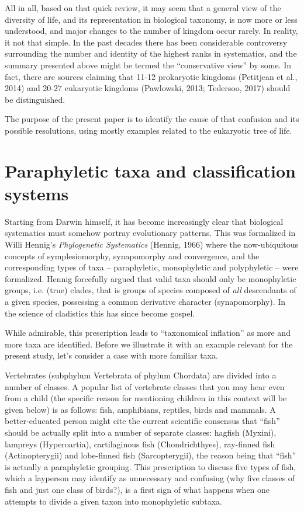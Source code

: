 \begin{artengenv}
All in all, based on that quick review, it may seem that a general view of the diversity of life, and its representation
in biological taxonomy, is now more or less understood, and major changes to the number of kingdom occur rarely. In
reality, it not that simple. In the past decades there has been considerable controversy surrounding the number and
identity of the highest ranks in systematics, and the summary presented above might be termed the “conservative view”
by some. In fact, there are sources claiming that 11-12 prokaryotic kingdoms \label{ref:RNDXxF0Lm1b0k}(Petitjean et
al., 2014) and 20-27 eukaryotic kingdoms \label{ref:RNDB4YmCpjg7j}(Pawlowski, 2013; Tedersoo, 2017) should be
distinguished.

The purpose of the present paper is to identify the cause of that confusion and its possible resolutions, using mostly
examples related to the eukaryotic tree of life.

\section{Paraphyletic taxa and classification systems}

Starting from Darwin himself, it has become increasingly clear that biological systematics must somehow portray
evolutionary patterns. This was formalized in Willi Hennig’s \textit{Phylogenetic Systematics}
\label{ref:RNDWJhbleZaU4}(Hennig, 1966) where the now-ubiquitous concepts of symplesiomorphy, synapomorphy and
convergence, and the corresponding types of taxa – paraphyletic, monophyletic and polyphyletic – were formalized.
Hennig forcefully argued that valid taxa should only be monophyletic groups, i.e. (true) clades, that is groups of
species composed of \textit{all} descendants of a given species, possessing a common derivative character
(synapomorphy). In the science of cladistics this has since become gospel.

While admirable, this prescription leads to “taxonomical inflation” as more and more taxa are identified. Before we
illustrate it with an example relevant for the present study, let’s consider a case with more familiar taxa.

Vertebrates (subphylum Vertebrata of phylum Chordata) are divided into a number of classes. A popular list of vertebrate
classes that you may hear even from a child (the specific reason for mentioning children in this context will be given
below) is as follows: fish, amphibians, reptiles, birds and mammals. A better-educated person might cite the current
scientific consensus that “fish” should be actually split into a number of separate classes: hagfish (Myxini), lampreys
(Hyperoartia), cartilaginous fish (Chondrichthyes), ray-finned fish (Actinopterygii) and lobe-finned fish
(Sarcopterygii), the reason being that “fish” is actually a paraphyletic grouping. This prescription to discuss five
types of fish, which a layperson may identify as unnecessary and confusing (why five classes of fish and just one class
of birds?), is a first sign of what happens when one attempts to divide a given taxon into monophyletic subtaxa.


\end{artengenv}

